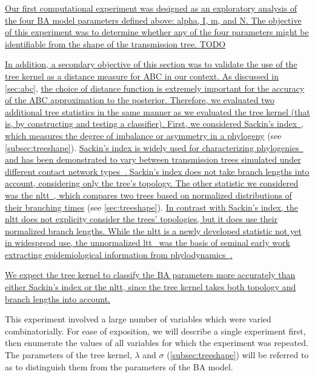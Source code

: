 {\color{blue}\uline{
Our first computational experiment was designed as an exploratory analysis of
the four \gls{BA} model parameters defined above: \gls{alpha}, \gls{I},
\gls{m}, and \gls{N}. The objective of this experiment was to determine whether
any of the four parameters might be identifiable from the shape of the
transmission tree. TODO }

\uline{In addition, a secondary objective of this section was to validate the
use of the tree kernel as a distance measure for \gls{ABC} in our context. As
discussed in} \cref{sec:abc}, \uline{the choice of distance function is
extremely important for the accuracy of the \gls{ABC} approximation to the
posterior. Therefore, we evaluated two additional tree statistics in the same
manner as we evaluated the tree kernel (that is, by constructing and testing a
classifier). First, we considered Sackin's index~\autocite{shao1990tree}, which
measures the degree of imbalance or asymmetry in a phylogeny} (see
\cref{subsec:treeshape}). \uline{Sackin's index is widely used for
characterizing phylogenies~\autocite{frost2013modelling} and has been
demonstrated to vary between transmission trees simulated under different
contact network types~\autocite{leventhal2012inferring}. Sackin's index does
not take branch lengths into account, considering only the tree's topology. The
other statistic we considered was the
\gls{nltt}~\autocite{janzen2015approximate}, which compares two trees based on
normalized distributions of their branching times} (see \cref{sec:treeshape}).
\uline{In contrast with Sackin's index, the \gls{nltt} does not explicity
consider the trees' topologies, but it does use their normalized branch
lengths. While the \gls{nltt} is a newly developed statistic not yet in
widespread use, the unnormalized \gls{ltt}~\autocite{nee1992tempo} was the
basis of seminal early work extracting epidemiological information from
phylodynamics~\autocite{holmes1995revealing}.}

\uline{We expect the tree kernel to classify the \gls{BA} parameters more
accurately than either Sackin's index or the \gls{nltt}, since the tree kernel
takes both topology and branch lengths into account. }}

This experiment involved a large number of variables which were varied
combinatorially. For ease of exposition, we will describe a single experiment
first, then enumerate the values of all variables for which the experiment was
repeated. The parameters of the tree kernel, $\lambda$ and $\sigma$
(\cref{subsec:treeshape}) will be referred to as  to
distinguish them from the parameters of the \gls{BA} model. 

